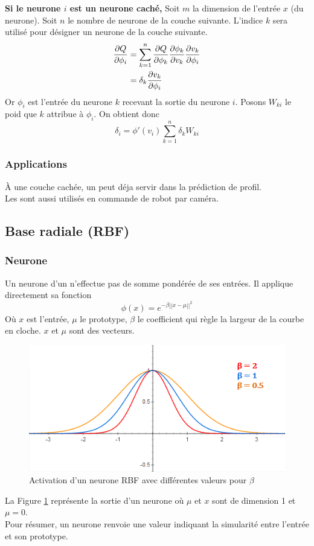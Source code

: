 \documentclass[12pt,a4paper,oneside, titlepage]{article}
\begin{document}
\textbf{Si le neurone $i$ est un neurone caché,}
Soit $m$ la dimension de l'entrée $x$ (du neurone). Soit $n$ le nombre de neurone de la couche suivante.
L'indice $k$ sera utilisé pour désigner un neurone de la couche suivante.
\begin{equation}
 \begin{split}
  \frac{\partial Q}{\partial \phi_i} & = \sum_{k=1}^{n} \frac{\partial Q}{\partial \phi_k} \frac{\partial \phi_k}{\partial v_k} \frac{\partial v_k}{\partial \phi_i}\\
  ~ & = \delta_k \frac{\partial v_k}{\partial \phi_i}
 \end{split}
\end{equation}
Or $\phi_i$ est l'entrée du neurone $k$ recevant la sortie du neurone $i$. Posons $W_{ki}$ le poid que $k$ attribue à $\phi_i$.
On obtient donc \[\delta_i = \phi'(v_i) \sum_{k=1}^{n}\delta_{k}W_{ki}\]
\subsubsection*{Applications}
À une couche cachée, un \mlp peut déja servir dans la prédiction de profil.\cite{statistica}\\
Les \mlp sont aussi utilisés en commande de robot par caméra.\cite{Pomerleau}

\subsection{Base radiale (RBF)}
\subsubsection*{Neurone}
Un neurone d'un \rbf n'effectue pas de somme pondérée de ses entrées. Il applique directement sa fonction \[\phi(x) = e^{-\beta||x-\mu||^2}\]
Où $x$ est l'entrée, $\mu$ le prototype, $\beta$ le coefficient qui règle la largeur de la courbe en cloche. $x$ et $\mu$ sont des vecteurs.
\begin{figure}
 \centering
 \includegraphics[scale=0.7]{../figures/RBFactivation.png}
 \caption{Activation d'un neurone RBF avec différentes valeurs pour $\beta$}
 \label{rbfactivation}
\end{figure}
La Figure \ref{rbfactivation} représente la sortie d'un neurone \rbf où $\mu$ et $x$ sont de dimension 1 et $\mu = 0$.\\
Pour résumer, un neurone \rbf renvoie une valeur indiquant la simularité entre l'entrée et son prototype.
\end{document}
